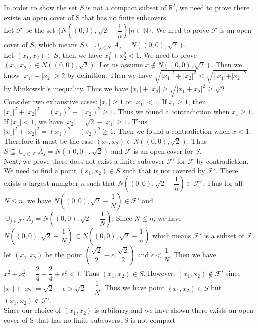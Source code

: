 \documentclass{article}
\begin{document}
\begin{enumerate}
 In order to show the set $S$ is not a compact subset of $\mathbb{R}^2$, we need to prove there exists an open cover of S that has no finite subcovers.\\

Let $\mathscr{F}$ be the set $\{N((0,0),\sqrt{2}-\dfrac{1}{n})|n \in \mathbb{N} \}$. We need to prove $\mathscr{F}$ is an open cover of $S$, which means $S \subseteq \cup_{j \in \mathscr{F}} A_j = N((0,0), \sqrt{2})$. \\

Let $(x_1,x_2) \in S$, then we have $x_1^2+x_2^2<1$. We need to prove $(x_1,x_2) \in N((0,0), \sqrt{2})$. Let us assume $x \notin  N((0,0), \sqrt{2})$. Then we know $|x_1|+|x_2| \geq 2$ by definition. Then we have  $\sqrt{|x_1|^2+|x_2|^2} \leq \sqrt{||x_1|+|x_2||^2}$ by Minkowski's inequality. Thus we have $|x_1| + |x_2| \geq \sqrt{|x_1+x_2|^2} \geq \sqrt{2}$. Consider two exhaustive cases: $|x_1| \geq 1$ or $|x_1|<1$. If $x_1 \geq 1$, then $|x_1|^2+|x_2|^2 = (x_1)^2+(x_2)^2 \geq 1$. Thus we found a contradiction when $x_1 \geq 1$. If $|x_1|<1$, we have $|x_2| = \sqrt{2} - |x_1| \geq 1$. Thus $|x_1|^2+|x_2|^2 = (x_1)^2+(x_2)^2 \geq 1$. Then we found a contradiction when $x<1$. Therefore it must be the case $(x_1,x_2) \in N((0,0), \sqrt{2})$. Thus $S \subseteq \cup_{j \in \mathscr{F}} A_j = N((0,0), \sqrt{2})$ and $\mathscr{F}$ is an open cover for $S$.\\

Next, we prove there does not exist a finite subcover $\mathscr{F'}$ for $\mathscr{F}$ by contradiction. We need to find a point $(x_1,x_2) \in S$ such that is not covered by $\mathscr{F}'$. There exists a largest numgber $n$ such that $N((0,0), \sqrt{2} - \dfrac{1}{n}) \in \mathscr{F}'$. Thus for all $N \leq n$, we have $N((0,0), \sqrt{2}-\dfrac{1}{N}) \in \mathscr{F}'$ and $ \cup_{j \in \mathscr{F}'} A_j = N((0,0), \sqrt{2}-\dfrac{1}{N})$. Since $N \leq n$, we have $N((0,0), \sqrt{2}-\dfrac{1}{N}) \subset N((0,0), \sqrt{2}-\dfrac{1}{n})$ which means $\mathscr{F}'$ is a subset of $\mathscr{F}$. let $(x_1,x_2)$ be the point $(\dfrac{\sqrt{2}}{2}-\epsilon,\dfrac{\sqrt{2}}{2})$ and $\epsilon < \dfrac{1}{N}$, Then we have $x_1^2 + x_2^2 = \dfrac{2}{4} + \dfrac{2}{4} + \epsilon^2 <1$. Thus $(x_1,x_2) \in S$. However, $(x_1,x_2) \notin \mathscr{F}'$ since $|x_1|+|x_2| = \sqrt{2}-\epsilon > \sqrt{2} - \dfrac{1}{N}$. Thus we have point $(x_1,x_2) \in S$ but $(x_1,x_2) \notin \mathscr{F}'$.\\

Since our choice of $(x_1,x_2)$ is arbitarry and we have shown there exists an open cover of S that has no finite subcovers, S is not compact
\end{enumerate}
\end{document}
